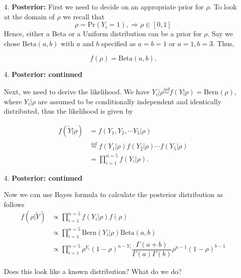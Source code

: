 \documentclass[12pt,xcolor=svgnames]{beamer}
\newcommand{\bl}{\color{blue}}
\newcommand{\pr}{\text{Pr}}
\begin{document}
\begin{frame}
\begin{enumerate}

\item[4. ] {\bf Posterior:}
First we need to decide on an appropriate  {\bl prior} for $\rho.$ To look at the domain of $\rho$ we recall that 
\begin{equation*}
\rho = \pr(Y_i = 1),\Rightarrow \rho \in [0, 1] 
\end{equation*}
Hence, either a {\bl Beta} or a {\bl Uniform} distribution can be a prior for $\rho.$ Say we chose $\text{Beta}(a,b)$ with $a$ and $b$ specified as $a=b=1$ or $a=1,b=3$. Thus,

$$ f(\rho) = \text{Beta}(a,b).$$
\end{enumerate}
\end{frame}

\begin{frame}
\begin{enumerate}

\item[4. ] {\bf Posterior: continued} 

Next, we need to derive the likelihood. We have $Y_i|\rho   \stackrel{iid}{\sim} f(Y|\rho) = \text{Bern}(\rho),$ where $Y_i|\rho$ are assumed to be {\bl conditionally} independent and identically distributed, thus the likelihood is given by

\begin{align*}
f(\tilde{Y}|\rho) &= f(Y_1, Y_2, \cdots Y_5|\rho)\\
& \stackrel{iid}{=}  f(Y_1|\rho) f(Y_2|\rho)  \cdots f(Y_5|\rho)\\
& = \prod_{i=1}^{n=5} f(Y_i|\rho).
\end{align*}
\end{enumerate}
\end{frame}


\begin{frame}
\begin{enumerate}

\item[4. ] {\bf Posterior: continued} 

Now we can use {\bl Bayes} formula to calculate the posterior distribution as follows
\begin{align*}
f(\rho|\tilde{Y}) &\propto \prod_{i=1}^{n=5} f(Y_i|\rho) f(\rho)\\
&\propto  \prod_{i=1}^{n=5} \text{Bern}(Y_i|\rho)\text{Beta}(a,b)\\
&\propto  \prod_{i=1}^{n=5} \rho^{Y_i} (1- \rho)^{n-Y_i} \dfrac{\Gamma (a+b)}{\Gamma (a)\Gamma (b)} \rho^{a-1} (1-\rho)^{b-1}
\end{align*}

Does this look like a known distribution? What do we do?

\end{enumerate}
\end{frame}
\end{document}
